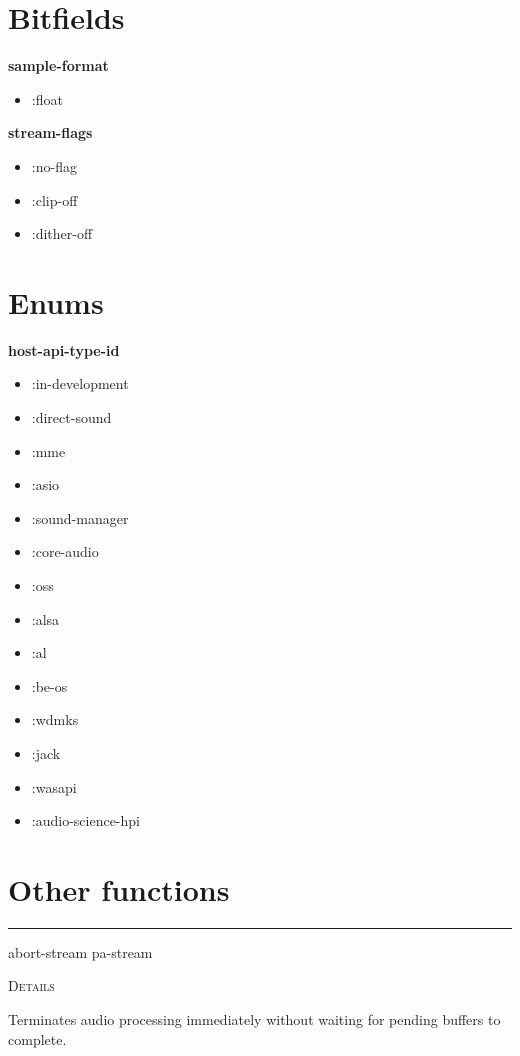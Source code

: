 \documentclass[a4paper]{report}
\begin{document}
  \section{Bitfields} \label{d0d0e0e0e0e14}  \textbf{sample-format}  
    \begin{itemize}
        
    \item :float  
    \end{itemize}
    \textbf{stream-flags}  
    \begin{itemize}
        
    \item :no-flag  
    \item :clip-off  
    \item :dither-off  
    \end{itemize}
  \section{Enums} \label{d0d0e0e0e0e15}  \textbf{host-api-type-id}  
    \begin{itemize}
        
    \item :in-development  
    \item :direct-sound  
    \item :mme  
    \item :asio  
    \item :sound-manager  
    \item :core-audio  
    \item :oss  
    \item :alsa  
    \item :al  
    \item :be-os  
    \item :wdmks  
    \item :jack  
    \item :wasapi  
    \item :audio-science-hpi  
    \end{itemize}
  
      \section{Other functions}
      

    \rule{\linewidth}{0.1mm}
    
    \label{portaudio__fun__abort-stream}
    \begin{defun}[Function]
    abort-stream pa-stream


	
    \bigskip
    \textsc{Details}

Terminates audio processing immediately without waiting for pending buffers to complete.


    
    \end{defun}
  
\end{document}
